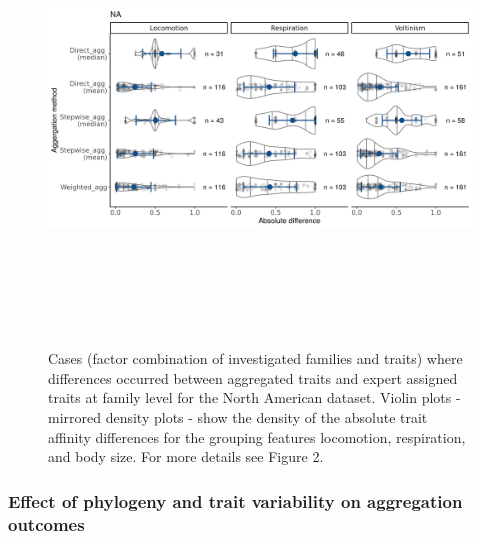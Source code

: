 \documentclass[12pt]{article}
\begin{document}
\begin{figure}[H]
    \centering
    \includegraphics[width=15cm, height=12cm]{Deviances_trait_agg_pyne.png}
    \caption{Cases (factor combination of investigated families and traits) where differences occurred between aggregated traits and expert assigned traits at family level for the North American dataset. Violin plots - mirrored density plots - show the density of the absolute trait affinity differences for the grouping features locomotion, respiration, and body size. For more details see Figure 2.}%
    \label{fig:diff_aggr_traits_pyne}
\end{figure}

\subsubsection*{Effect of phylogeny and trait variability on aggregation outcomes}
\end{document}
